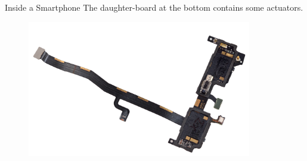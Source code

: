 \documentclass[aspectratio=169]{beamer}
\begin{document}
	\begin{frame}{Inside a Smartphone}
		The daughter-board at the bottom contains some actuators.
		\begin{figure}[b]
		\centering
		\includegraphics[width=\textwidth,height=6cm,keepaspectratio]{img/wdnGHA1UB3lBpZIL.png}
		\end{figure}
	\end{frame}    
\end{document}

